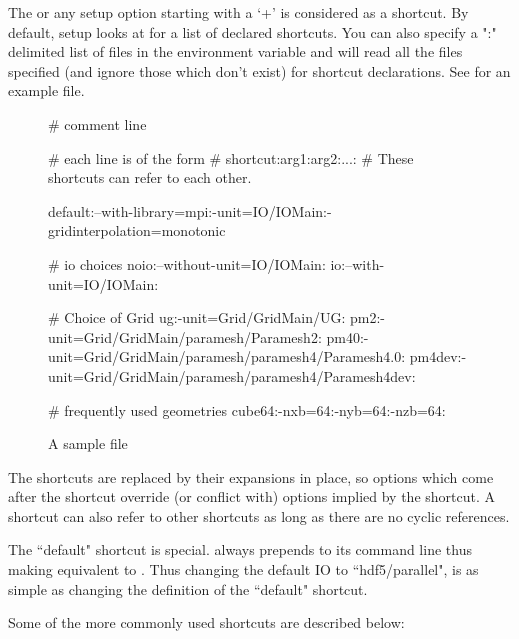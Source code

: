 The  or any setup option starting with a `+' is
considered as a shortcut. By default, setup looks at
 for a list of declared shortcuts.
You can also specify a ":" delimited list of files in the
environment variable  and \setup will read
all the files specified (and ignore those which don't exist) for
shortcut declarations. See  for an example
file.

\begin{figure}[htbp]
\begin{fcodeseg}
 # comment line

 # each line is of the form # shortcut:arg1:arg2:...:
 # These shortcuts can refer to each other.

 default:--with-library=mpi:-unit=IO/IOMain:-gridinterpolation=monotonic

 # io choices
 noio:--without-unit=IO/IOMain:
 io:--with-unit=IO/IOMain:

 # Choice of Grid
 ug:-unit=Grid/GridMain/UG:
 pm2:-unit=Grid/GridMain/paramesh/Paramesh2:
 pm40:-unit=Grid/GridMain/paramesh/paramesh4/Paramesh4.0:
 pm4dev:-unit=Grid/GridMain/paramesh/paramesh4/Paramesh4dev:

 # frequently used geometries
 cube64:-nxb=64:-nyb=64:-nzb=64:
\end{fcodeseg}
\caption{A sample  file\label{Fig:ShortcutFile}}
\end{figure}

The shortcuts are replaced by their expansions in place, so options
which come after the shortcut override (or conflict with) options
implied by the shortcut. A shortcut can also refer to other
shortcuts as long as there are no cyclic references.

The ``default"%
shortcut is special. \setup
always prepends  to its command line thus making
 equivalent to .
Thus changing the default IO to ``hdf5/parallel", is as simple as
changing the definition of the ``default" shortcut.

Some of the more commonly used shortcuts are described below:

